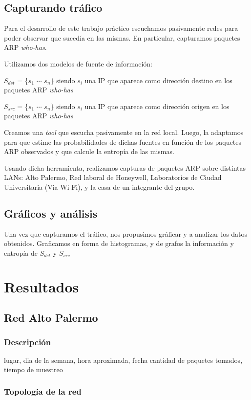\documentclass[10pt, a4paper]{article}
\begin{document}
\subsection{Capturando tráfico}
Para el desarrollo de este trabajo práctico escuchamos pasivamente redes para poder observar que sucedía en las mismas. En particular, capturamos paquetes ARP \emph{who-has}.

Utilizamos dos modelos de fuente de información:

$S_{dst}$ = \{$s_1$ $\cdots$ $s_n$\} siendo $s_i$ una IP que aparece como dirección destino en los paquetes ARP \emph{who-has}

$S_{src}$ = \{$s_1$ $\cdots$ $s_n$\} siendo $s_i$ una IP que aparece como dirección origen en los paquetes ARP \emph{who-has}

Creamos una \emph{tool} que escucha pasivamente en la red local. Luego, la adaptamos para que estime las probabilidades de dichas fuentes en función de los paquetes ARP observados y que calcule la entropía de las mismas.

Usando dicha herramienta, realizamos capturas de paquetes ARP sobre distintas LANs: Alto Palermo, Red laboral de Honeywell, Laboratorios de Ciudad Universitaria (Via Wi-Fi), y la casa de un integrante del grupo.

\subsection{Gráficos y análisis}
Una vez que capturamos el tráfico, nos propusimos gráficar y a analizar los datos obtenidos. Graficamos en forma de histogramas, y de grafos la información y entropía de $S_{dst}$ y $S_{src}$

\section{Resultados}

\subsection{Red Alto Palermo}

\subsubsection{Descripción}

lugar, dia de la semana, hora aproximada, fecha
cantidad de paquetes tomados, tiempo de muestreo

\subsubsection{Topología de la red}
\end{document}
